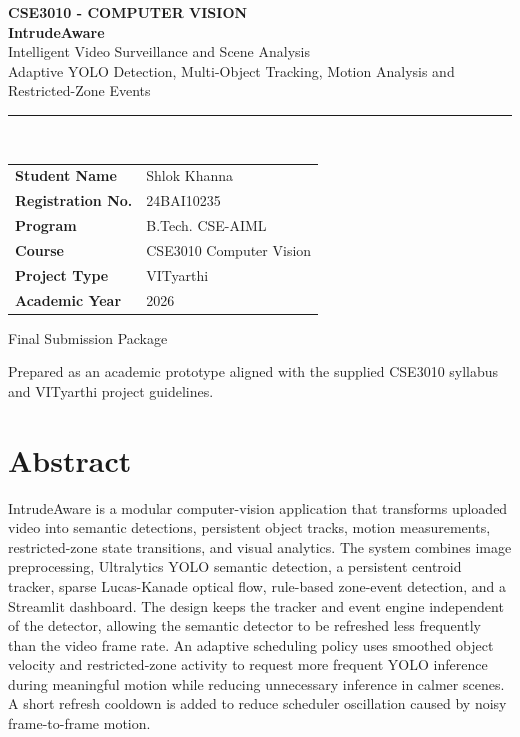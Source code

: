 \documentclass[12pt,a4paper]{report}
\newcommand{\projectname}{IntrudeAware}
\begin{document}
\begin{titlepage}
\centering
\vspace*{1.0cm}
{\Large \textbf{CSE3010 - COMPUTER VISION}}\\[0.6cm]
{\Huge \textbf{IntrudeAware}}\\[0.25cm]
{\LARGE Intelligent Video Surveillance and Scene Analysis}\\[0.6cm]
{\large Adaptive YOLO Detection, Multi-Object Tracking, Motion Analysis and Restricted-Zone Events}\\[1.0cm]
\rule{0.82\textwidth}{0.8pt}\\[0.8cm]
\begin{tabular}{>{\bfseries}p{}p{}}
Student Name & Shlok Khanna \\
Registration No. & 24BAI10235 \\
Program  & B.Tech. CSE-AIML \\
Course & CSE3010 Computer Vision \\
Project Type & VITyarthi \\
Academic Year & 2026 \\
\end{tabular}
\vfill
{\large Final Submission Package}\par
\vspace{0.4cm}
{\small Prepared as an academic prototype aligned with the supplied CSE3010 syllabus and VITyarthi project guidelines.}
\end{titlepage}

\chapter*{Abstract}
\projectname{} is a modular computer-vision application that transforms uploaded video into semantic detections, persistent object tracks, motion measurements, restricted-zone state transitions, and visual analytics. The system combines image preprocessing, Ultralytics YOLO semantic detection, a persistent centroid tracker, sparse Lucas-Kanade optical flow, rule-based zone-event detection, and a Streamlit dashboard. The design keeps the tracker and event engine independent of the detector, allowing the semantic detector to be refreshed less frequently than the video frame rate. An adaptive scheduling policy uses smoothed object velocity and restricted-zone activity to request more frequent YOLO inference during meaningful motion while reducing unnecessary inference in calmer scenes. A short refresh cooldown is added to reduce scheduler oscillation caused by noisy frame-to-frame motion.
\end{document}

